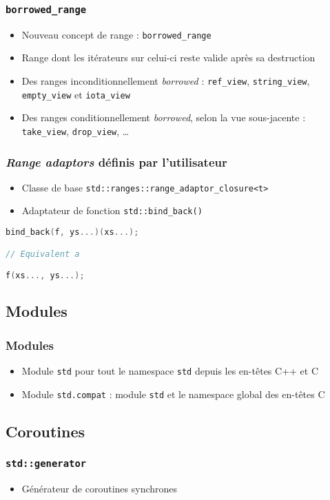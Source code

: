 \documentclass[C++.tex]{subfiles}
\begin{document}
\begin{frame}[fragile]
	\frametitle{\lstinline|borrowed_range|}
	\begin{itemize}
		\item Nouveau concept de range : \lstinline|borrowed_range|
		\item Range dont les itérateurs sur celui-ci reste valide après sa destruction
		\item Des ranges inconditionnellement \textit{borrowed} : \lstinline|ref_view|, \lstinline|string_view|, \lstinline|empty_view| et \lstinline|iota_view|
		\item Des ranges conditionnellement \textit{borrowed}, selon la vue sous-jacente : \lstinline|take_view|, \lstinline|drop_view|, \ldots{}
	\end{itemize}
\end{frame}

\begin{frame}[fragile]
	\frametitle{\textit{Range adaptors} définis par l'utilisateur}
	\begin{itemize}
		\item Classe de base \lstinline|std::ranges::range_adaptor_closure<t>|
		\item Adaptateur de fonction \lstinline|std::bind_back()|
	\end{itemize}

	\begin{lstlisting}[language=C++]
bind_back(f, ys...)(xs...);

// Equivalent a

f(xs..., ys...);\end{lstlisting}
\end{frame}

\subsection*{Modules}
\begin{frame}[fragile]
	\frametitle{Modules}
	\begin{itemize}
		\item Module \lstinline|std| pour tout le namespace \lstinline|std| depuis les en-têtes C++ et C
		\item Module \lstinline|std.compat| : module \lstinline|std| et le namespace global des en-têtes C
	\end{itemize}
\end{frame}

\subsection*{Coroutines}
\begin{frame}[fragile]
	\frametitle{\lstinline|std::generator|}
	\begin{itemize}
		\item Générateur de coroutines synchrones
	\end{itemize}
\end{frame}
\end{document}
